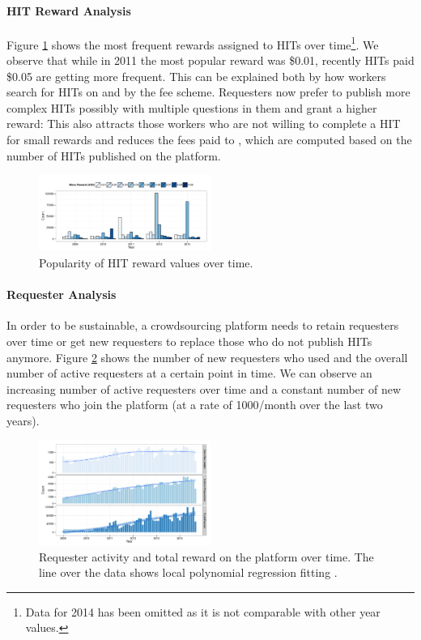 \paragraph{HIT Reward Analysis}
Figure \ref{fig:reward_year} shows the most frequent rewards assigned to HITs over time\footnote{Data for 2014 has been omitted as it is not comparable with other year values.}. We observe that while in 2011 the most popular reward was \$0.01, recently HITs paid \$0.05 are getting more frequent. This can be explained both by how workers search for HITs on \amt{} and by the \amt{} fee scheme. Requesters now prefer to publish more complex HITs possibly with multiple questions in them and grant a higher reward: This also attracts those workers who are not willing to complete a HIT for small rewards and reduces the fees paid to \amt{}, which are computed based on the number of HITs published on the platform.

\begin{figure}[tb]
	\centering
		\includegraphics[width=0.5\textwidth]{figures/reward_year}
	\caption{Popularity of HIT reward values over time.}
	\label{fig:reward_year}
\end{figure}



\paragraph{Requester Analysis}
In order to be sustainable, a crowdsourcing platform needs to retain requesters over time or get new requesters to replace those who do not publish HITs anymore. Figure \ref{fig:requesters_reward} shows the number of new requesters who used \amt{} and the overall number of active requesters at a certain point in time. We can observe an increasing number of active requesters over time and a constant number of new requesters who join the platform (at a rate of 1000/month over the last two years).

\begin{figure}[tb]
	\centering
		\includegraphics[width=0.5\textwidth]{figures/requesters_reward}
	\caption{Requester activity and total reward on the platform over time. The line over the data shows local polynomial regression fitting \cite{cleveland1992local}.}
	\label{fig:requesters_reward}
\end{figure}

